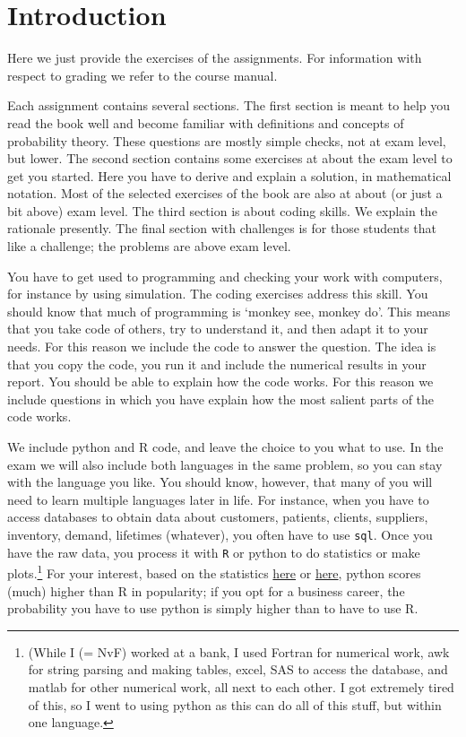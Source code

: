 \chapter{Introduction}
\label{sec:orgb865fed}

Here we just provide the exercises of the assignments.  For information with respect to grading we refer to the  course manual.


Each assignment contains several sections.
The first section is meant to help you read the book well and become familiar with definitions and concepts of probability theory.
These questions are mostly simple checks, not at exam level, but lower.
The second section contains some exercises at about the exam level to get you started.
Here you have to derive and explain a solution, in mathematical notation.
Most of the selected exercises of the book are also at about (or just a bit above) exam level.
The third section is about coding skills.
We explain the rationale presently.
The final section with challenges is for those students that like a challenge; the problems are above exam level.


You have to get used to programming and checking your work with computers, for instance by using simulation.
The coding exercises address this skill.
You should know that much of programming is `monkey see, monkey do'.
This means that you take code of others, try to understand it, and then adapt it to your needs.
For this reason we include the code to answer the question.
The idea is that you copy the code, you  run it and include the numerical results in your report. You should be able to explain how the code works. For this reason we include questions in which you have explain how the most salient parts of the code works.

We include python and R code, and leave the choice to you what to use.
In the exam we will also include both languages in the same problem, so you can stay with the language you like.
You should know, however, that many of you will need to learn multiple languages later in life.
For instance, when you have to access databases to obtain data about customers, patients, clients, suppliers, inventory, demand, lifetimes (whatever), you often have to use \texttt{sql}.
Once you have the raw data, you process it with \texttt{R} or python to do statistics or make plots.\footnote{(While I (= NvF) worked at a bank, I used Fortran for numerical work, awk for string parsing and making tables, excel, SAS to access the database, and matlab for other numerical work, all next to each other.
I got extremely tired of this, so I went to using python as this can do all of this stuff, but within one language.}
For your interest, based on the statistics \href{https://www.tiobe.com/tiobe-index/}{here} or \href{https://www.northeastern.edu/graduate/blog/most-popular-programming-languages/}{here}, python scores (much) higher than R in popularity; if you opt for a business career, the probability you have to use python is simply higher than to have to use R.

